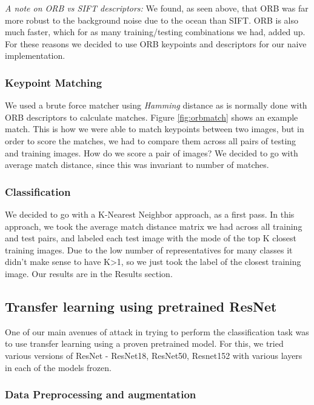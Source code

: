 \textit{A note on ORB vs SIFT descriptors:} We found, as seen above, that ORB was far more robust to the background noise due to the ocean than SIFT. ORB is also much faster, which for as many training/testing combinations we had, added up. For these reasons we decided to use ORB keypoints and descriptors for our naive implementation. 

\subsubsection{Keypoint Matching}

We used a brute force matcher using \textit{Hamming} distance as is normally done with ORB descriptors to calculate matches. Figure \ref{fig:orbmatch} shows an example match. This is how we were able to match keypoints between two images, but in order to score the matches, we had to compare them across all pairs of testing and training images. How do we score a pair of images? We decided to go with average match distance, since this was invariant to number of matches.

\subsubsection{Classification}

We decided to go with a K-Nearest Neighbor approach, as a first pass. In this approach, we took the average match distance matrix we had across all training and test pairs, and labeled each test image with the mode of the top K closest training images. Due to the low number of representatives for many classes it didn't make sense to have K>1, so we just took the label of the closest training image. Our results are in the Results section.

\subsection{Transfer learning using pretrained ResNet}

One of our main avenues of attack in trying to perform the classification task was to use transfer learning using a proven pretrained model. For this, we tried various versions of ResNet - ResNet18, ResNet50, Resnet152 with various layers in each of the models frozen.

\subsubsection{Data Preprocessing and augmentation}

